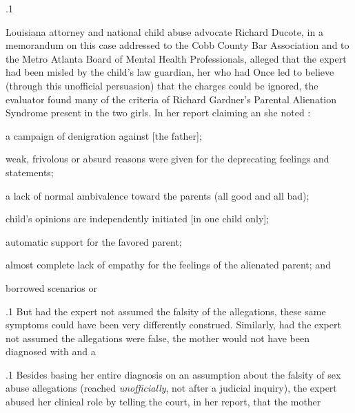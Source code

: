 \documentclass[11pt, twoside]{article}
\begin{document}
{\p.1{%
Louisiana attorney and national child abuse advocate Richard
Ducote, in a memorandum on this case addressed to the Cobb County
Bar Association and to the Metro Atlanta Board of Mental Health Professionals, alleged that the expert had been misled by the child’s law
guardian, her  who had  Once led to believe (through this unofficial persuasion) that the charges could be ignored, the evaluator found many
of the criteria of Richard Gardner’s Parental Alienation Syndrome
present in the two girls. In her report
claiming an  she noted :

\begin{docEnumerate}

\enumsItem{}  a campaign of denigration against [the father];

\enumsItem{}  weak, frivolous or absurd reasons were given for the
deprecating feelings and statements;

\enumsItem{}  a lack of normal ambivalence toward the parents (all good and
all bad);

\enumsItem{}  child’s opinions are independently initiated [in one child only];

\enumsItem{}  automatic support for the favored parent;

\enumsItem{}  almost complete lack of empathy for the feelings of the
alienated parent; and

\enumsItem{}  borrowed scenarios or 

\end{docEnumerate}

}%

\p.1{%
But had the expert not assumed the falsity of the allegations, these
same symptoms could have been very differently construed. Similarly,
had the expert not assumed the allegations were false, the mother would
not have been diagnosed with  and a 
}%

\p.1{%
Besides basing her entire diagnosis on an assumption about the falsity of sex abuse allegations (reached \textit{unofficially}, not after a judicial
inquiry), the expert abused her clinical role by telling the court, in her
report, that the mother 
}%

}
\end{document}

